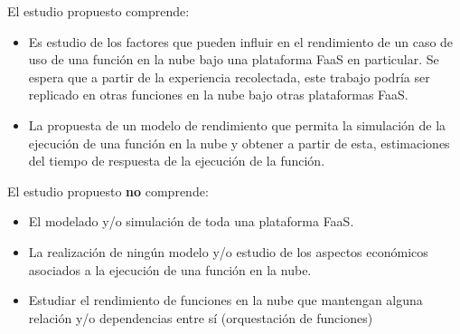 El estudio propuesto comprende:
\begin{itemize}
    \item Es estudio de los factores que pueden influir en el rendimiento de un caso de uso de una función en la nube bajo una plataforma FaaS en particular. Se espera que a partir de la experiencia recolectada, este trabajo podría ser replicado en otras funciones en la nube bajo otras plataformas FaaS.
    \item La propuesta de un modelo de rendimiento que permita la simulación de la ejecución de una función en la nube y obtener a partir de esta, estimaciones del tiempo de respuesta de la ejecución de la función.
\end{itemize}


El estudio propuesto \textbf{no} comprende:
\begin{itemize}
    \item El modelado y/o simulación de toda una plataforma FaaS.
    \item La realización de ningún modelo y/o estudio de los aspectos económicos asociados a la ejecución de una función en la nube.
    \item Estudiar el rendimiento de funciones en la nube que mantengan alguna relación y/o dependencias entre sí (orquestación de funciones)
    
\end{itemize}
